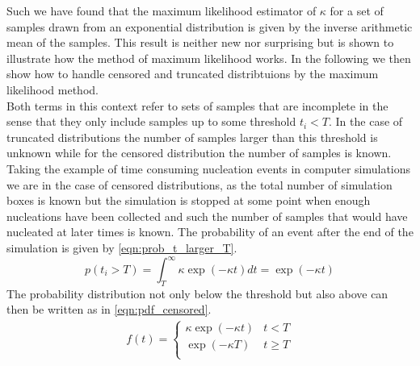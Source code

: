 Such we have found that the maximum likelihood estimator of $\kappa$ for a set of samples drawn from an exponential distribution is given by the inverse arithmetic mean of the samples. This result is neither new nor surprising but is shown to illustrate how the method of maximum likelihood works. In the following we then show how to handle censored and truncated distribtuions by the maximum likelihood method.\\
Both terms in this context refer to sets of samples that are incomplete in the sense that they only include samples up to some threshold $t_i < T$. In the case of truncated distributions the number of samples larger than this threshold is unknown while for the censored distribution the number of samples is known. Taking the example of time consuming nucleation events in computer simulations we are in the case of censored distributions, as the total number of simulation boxes is known but the simulation is stopped at some point when enough nucleations have been collected and such the number of samples that would have nucleated at later times is known. The probability of an event after the end of the simulation is given by \autoref{eqn:prob_t_larger_T}.
\begin{equation}
\label{eqn:prob_t_larger_T}
p(t_i>T) = \int_T^{\infty} \kappa \exp(-\kappa t) dt = \exp(-\kappa t) 
\end{equation}
The probability distribution not only below the threshold but also above can then be written as in \autoref{eqn:pdf_censored}.
\begin{align}
\label{eqn:pdf_censored}
f(t) = 
\begin{cases}
\kappa \exp(-\kappa t) & t < T\\
\exp(-\kappa T) & t \geq T\\ 
\end{cases}
\end{align}


